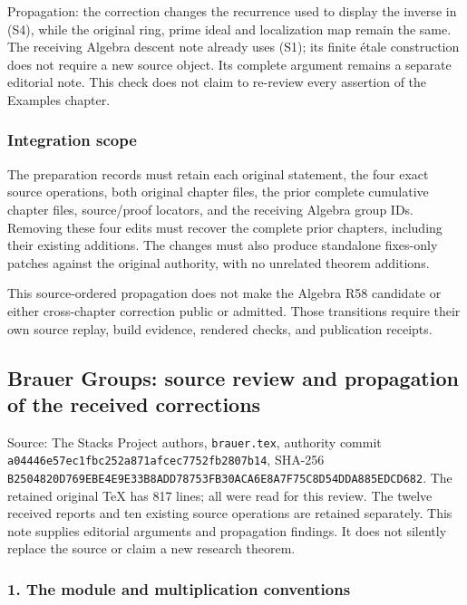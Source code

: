 \documentclass[11pt]{article}
\begin{document}
Propagation: the correction changes the recurrence used to display the inverse in (S4), while the original ring, prime ideal and localization map remain the same. The receiving Algebra descent note already uses (S1); its finite étale construction does not require a new source object. Its complete argument remains a separate editorial note. This check does not claim to re-review every assertion of the Examples chapter.

\subsubsection{Integration scope}\label{integration-scope}

The preparation records must retain each original statement, the four exact source operations, both original chapter files, the prior complete cumulative chapter files, source/proof locators, and the receiving Algebra group IDs. Removing these four edits must recover the complete prior chapters, including their existing additions. The changes must also produce standalone fixes-only patches against the original authority, with no unrelated theorem additions.

This source-ordered propagation does not make the Algebra R58 candidate or either cross-chapter correction public or admitted. Those transitions require their own source replay, build evidence, rendered checks, and publication receipts.

\clearpage
\subsection{Brauer Groups: source review and propagation of the received corrections}\label{brauer-groups-source-review-and-propagation-of-the-received-corrections}

Source: The Stacks Project authors, \texttt{brauer.tex}, authority commit \texttt{a04446e57ec1fbc252a871afcec7752fb2807b14}, SHA-256 \texttt{B2504820D769EBE4E9E33B8ADD78753FB30ACA6E8A7F75C8D54DDA885EDCD682}. The retained original TeX has 817 lines; all were read for this review. The twelve received reports and ten existing source operations are retained separately. This note supplies editorial arguments and propagation findings. It does not silently replace the source or claim a new research theorem.

\subsubsection{1. The module and multiplication conventions}\label{the-module-and-multiplication-conventions}
\end{document}
